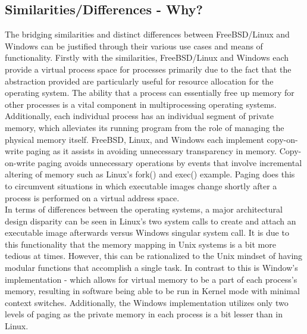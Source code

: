 \documentclass[letterpaper,10pt,titlepage]{article}
\begin{document}
\subsection{Similarities/Differences - Why?}

The bridging similarities and distinct differences between FreeBSD/Linux and Windows can be justified through their various use cases and means of functionality.  Firstly with the similarities, FreeBSD/Linux and Windows each provide a virtual process space for processes primarily due to the fact that the abstraction provided are particularly useful for resource allocation for the operating system.  The ability that a process can essentially free up memory for other processes is a vital component in multiprocessing operating systems.  Additionally, each individual process has an individual segment of private memory, which alleviates its running program from the role of managing the physical memory itself.  FreeBSD, Linux, and Windows each implement copy-on-write paging as it assists in avoiding unnecessary transparency in memory.  Copy-on-write paging avoids unnecessary operations by events that involve incremental altering of memory such as Linux's fork() and exec() example.  Paging does this to circumvent situations in which executable images change shortly after a process is performed on a virtual address space.\\

In terms of differences between the operating systems, a major architectural design disparity can be seen in Linux's two system calls to create and attach an executable image afterwards versus Windows singular system call.  It is due to this functionality that the memory mapping in Unix systems is a bit more tedious at times.  However, this can be rationalized to the Unix mindset of having modular functions that accomplish a single task.  In contrast to this is Window's implementation - which allows for virtual memory to be a part of each process's memory, resulting in software being able to be run in Kernel mode with minimal context switches.  Additionally, the Windows implementation utilizes only two levels of paging as the private memory in each process is a bit lesser than in Linux.\\

\newpage


\end{document}
